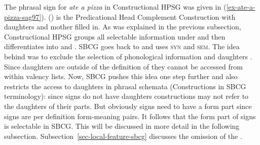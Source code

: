 \documentclass[output=paper]{langsci/langscibook}
\begin{document}

The phrasal sign for \emph{ate a pizza} in Constructional HPSG was given in
(\ref{ex-ate-a-pizza-sag97}). () is the Predicational Head Complement Construction with
daughters and mother filled in.
\ea
\label{feat-geom-sag2012}
\z
As was explained in the previous subsection, Constructional HPSG groups all selectable information under
\synsem and then differentiates into \cat and \cont. SBCG goes back to  and uses \textsc{syn} and
\textsc{sem}. The idea behind \synsem was to exclude the selection of phonological information and
daughters \citep[]{ps2}. Since daughters are outside of the definition of  they cannot be accessed from
within valency lists. Now, SBCG pushes this idea one step further and also restricts the access
to daughters in phrasal schemata (Constructions in SBCG terminology): since signs do not have
daughters constructions may not refer to the daughters of their parts. But obviously signs need to
have a form part since signs are per definition form-meaning pairs. It follows that the form part of
signs is selectable in SBCG. This will be discussed in more detail in the following
subsection. Subsection~\ref{sec-local-feature-sbcg} discusses the omission of the \localf.
\end{document}
